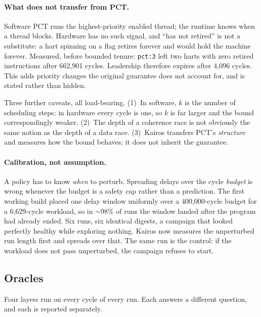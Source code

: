 \documentclass[sigconf,anonymous,review]{acmart}
\begin{document}
\paragraph{What does not transfer from PCT.}
Software PCT runs the highest-priority enabled thread; the
runtime knows when a thread blocks. Hardware has no such signal, and
``has not retired'' is not a substitute: a hart spinning on a flag
retires forever and would hold the machine forever. Measured, before
bounded tenure: \texttt{pct:3} left two harts with zero retired
instructions after 662{,}901 cycles. Leadership therefore expires
after 4{,}096 cycles. This adds priority changes the original
guarantee does not account for, and is stated rather than hidden.

Three further caveats, all load-bearing. (1)~In software, $k$ is the
number of scheduling steps; in hardware every cycle is one, so $k$ is
far larger and the bound correspondingly weaker. (2)~The depth of a
coherence race is not obviously the same notion as the depth of a data
race. (3)~Kairos transfers PCT's \emph{structure} and measures how the
bound behaves; it does not inherit the guarantee.

\paragraph{Calibration, not assumption.}
A policy has to know \emph{when} to perturb. Spreading delays over the
cycle \emph{budget} is wrong whenever the budget is a safety cap rather
than a prediction. The first working build placed one delay window
uniformly over a 400{,}000-cycle budget for a 6{,}629-cycle workload,
so in $\sim$98\% of runs the window landed after the program had
already ended. Six runs, six identical digests, a campaign that looked
perfectly healthy while exploring nothing. Kairos now measures the
unperturbed run length first and spreads over that. The same run is
the control: if the workload does not pass unperturbed, the campaign
refuses to start.

\subsection{Oracles}
\label{sec:oracles}

Four layers run on every cycle of every run. Each answers a different
question, and each is reported separately.
\end{document}
